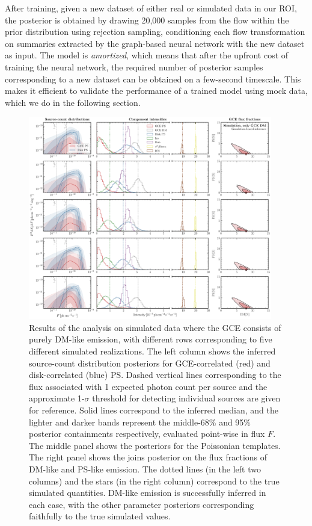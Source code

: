 \documentclass[prd,aps,10pt,nofootinbib,twocolumn,superscriptaddress,preprintnumbers,balancelastpage,longbibliography]{revtex4-1}
\begin{document}
After training, given a new dataset of either real or simulated \Fermi data in our ROI, the posterior is obtained by drawing 20,000 samples from the flow within the prior distribution using rejection sampling, conditioning each flow transformation on summaries extracted by the graph-based neural network with the new dataset as input. The model is \emph{amortized}, which means that after the upfront cost of training the neural network, the required number of posterior samples corresponding to a new dataset can be obtained on a few-second timescale. This makes it efficient to validate the performance of a trained model using mock data, which we do in the following section.

%
\begin{figure}
\centering
\includegraphics[width=0.95\textwidth]{plots/sim_sbi_dm.pdf}
\caption{Results of the analysis on simulated \Fermi data where the GCE consists of purely DM-like emission, with different rows corresponding to five different simulated realizations. The left column shows the inferred source-count distribution posteriors for GCE-correlated (red) and disk-correlated (blue) PS. Dashed vertical lines corresponding to the flux associated with 1 expected photon count per source and the approximate 1-$\sigma$ threshold for detecting individual sources are given for reference. Solid lines correspond to the inferred median, and the lighter and darker bands represent the middle-68\% and 95\% posterior containments respectively, evaluated point-wise in flux $F$. The middle panel shows the posteriors for the Poissonian templates. The right panel shows the joins posterior on the flux fractions of DM-like and PS-like emission. The dotted lines (in the left two columns) and the stars (in the right column) correspond to the true simulated quantities. DM-like emission is successfully inferred in each case, with the other parameter posteriors corresponding faithfully to the true simulated values.} 
\label{fig:sim_sbi_dm}
\end{figure}
%
\end{document}
